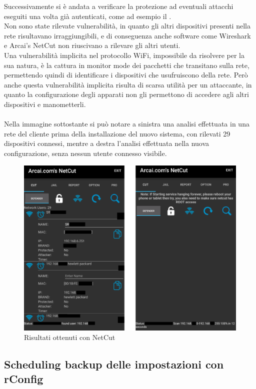 \documentclass[Realizzazione.tex]{subfiles}
\begin{document}
Successivamente si è andata a verificare la protezione ad eventuali attacchi eseguiti una volta già autenticati, come ad esempio il . \\
Non sono state rilevate vulnerabilità, in quanto gli altri dispositivi presenti nella rete risultavano irraggiungibili, e di conseguenza anche software come Wireshark e Arcai's NetCut non riuscivano a rilevare gli altri utenti. \\
Una vulnerabilità implicita nel protocollo WiFi, impossibile da risolvere per la sua natura, è la cattura in monitor mode dei pacchetti che transitano sulla rete, permettendo quindi di identificare i dispositivi che usufruiscono della rete. Però anche questa vulnerabilità implicita risulta di scarsa utilità per un attaccante, in quanto la configurazione degli apparati non gli permettono di accedere agli altri dispositivi e manometterli. \\\\
Nella immagine sottostante si può notare a sinistra una analisi effettuata in una rete del cliente prima della installazione del nuovo sistema, con rilevati 29 dispositivi connessi, mentre a destra l'analisi effettuata nella nuova configurazione, senza nessun utente connesso visibile.
\begin{figure}[H]
	\centering
	\includegraphics[width=1\linewidth]{"images/netcut"}
	\caption{Risultati ottenuti con NetCut}
	\label{fig:Risultati ottenuti con NetCut}
\end{figure}

\subsection{Scheduling backup delle impostazioni con rConfig}
\end{document}
